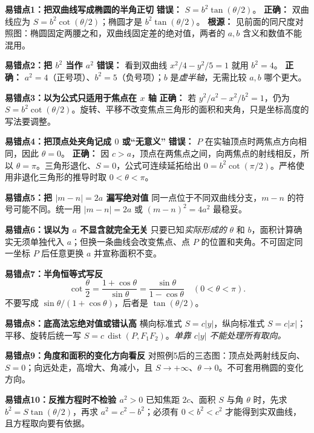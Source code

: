 \clearpage
\begin{trapbox}
\medskip
\textbf{\textcolor{CTrap}{易错点1：把双曲线写成椭圆的半角正切}}
\textbf{错误：} $S=b^2\tan(\theta/2)$。
\textbf{正确：} 双曲线应为 $\boxed{S=b^2\cot(\theta/2)}$；椭圆才是 $b^2\tan(\theta/2)$。
\textbf{根源：} 见前面的同尺度对照图：椭圆固定两腰之和，双曲线固定差的绝对值，两者的 $a,b$ 含义和数值不能混用。

\medskip
\textbf{\textcolor{CTrap}{易错点2：把 $b^2$ 当作 $a^2$}}
\textbf{错误：} 看到双曲线 $x^2/4-y^2/5=1$ 就用 $b^2=4$。
\textbf{正确：} $a^2=4$（正号项）、$b^2=5$（负号项）；$b$ 是\emph{虚半轴}，无需比较 $a,b$ 哪个更大。

\medskip
\textbf{\textcolor{CTrap}{易错点3：以为公式只适用于焦点在 $x$ 轴}}
\textbf{正确：} 若 $y^2/a^2-x^2/b^2=1$，仍为 $S=b^2\cot(\theta/2)$。旋转、平移不改变焦点三角形的面积和夹角，只是坐标高度的写法要调整。

\medskip
\textbf{\textcolor{CTrap}{易错点4：把顶点处夹角记成 $0$ 或“无意义”}}
\textbf{错误：} $P$ 在实轴顶点时两焦点方向相同，因此 $\theta=0$。
\textbf{正确：} 因 $c>a$，顶点在两焦点之间，向两焦点的射线相反，所以 $\theta=\pi$。三角形退化、$S=0$，公式可连续延拓给出 $0=b^2\cot(\pi/2)$。严格使用非退化三角形的推导时取 $0<\theta<\pi$。

\medskip
\textbf{\textcolor{CTrap}{易错点5：把 $|m-n|=2a$ 漏写绝对值}}
同一点位于不同双曲线分支，$m-n$ 的符号可能不同。统一用 $|m-n|=2a$ 或 $(m-n)^2=4a^2$ 最稳妥。

\medskip
\textbf{\textcolor{CTrap}{易错点6：误以为 $a$ 不显含就完全无关}}
只要已知\emph{实际形成的} $\theta$ 和 $b$，面积计算确实无须单独代入 $a$；但换一条曲线会改变焦点、点 $P$ 的位置和夹角。不可固定同一坐标 $P$ 后任意更换 $a$ 并宣称面积不变。

\medskip
\textbf{\textcolor{CTrap}{易错点7：半角恒等式写反}}
\[
\boxed{\cot\frac\theta2=\frac{1+\cos\theta}{\sin\theta}
=\frac{\sin\theta}{1-\cos\theta}}
\quad(0<\theta<\pi).
\]
不要写成 $\sin\theta/(1+\cos\theta)$，后者是 $\tan(\theta/2)$。

\medskip
\textbf{\textcolor{CTrap}{易错点8：底高法忘绝对值或错认高}}
横向标准式 $S=c|y|$，纵向标准式 $S=c|x|$；平移、旋转后统一写 $S=c\,\operatorname{dist}(P,F_1F_2)$。\emph{单靠 $c|y|$ 不能处理所有取向。}

\medskip
\textbf{\textcolor{CTrap}{易错点9：角度和面积的变化方向看反}}
对照例5后的三态图：顶点处两射线反向、$S=0$；向远处走，高增大、角减小，且 $S\to+\infty$、$\theta\to0$。不可套用椭圆的变化方向。

\medskip
\textbf{\textcolor{CTrap}{易错点10：反推方程时不检验 $a^2>0$}}
已知焦距 $2c$、面积 $S$ 与角 $\theta$ 时，先求 $b^2=S\tan(\theta/2)$，再求 $a^2=c^2-b^2$；必须有 $0<b^2<c^2$ 才能得到实双曲线，且方程取向要有依据。



\end{trapbox}
